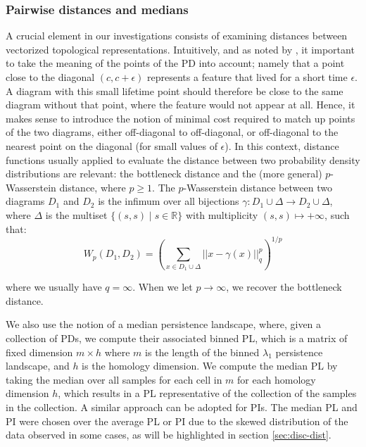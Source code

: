 \documentclass{article}
\begin{document}
\subsubsection{Pairwise distances and medians}\label{sec:pairwise_distance_definitions}

A crucial element in our investigations consists of examining distances between vectorized
topological representations. Intuitively, and as noted by \citet{berwald2018computing}, it important
to take the meaning of the points of the PD into account; namely that a point close to the diagonal
$(c,c+\epsilon)$ represents a feature that lived for a short time $\epsilon$. A diagram with this
small lifetime point should therefore be close to the same diagram without that point, where the
feature would not appear at all. Hence, it makes sense to introduce the notion of minimal cost
required to match up points of the two diagrams, either off-diagonal to off-diagonal, or
off-diagonal to the nearest point on the diagonal (for small values of $\epsilon$). In this context,
distance functions usually applied to evaluate the distance between two probability density
distributions are relevant: the bottleneck distance and the (more general) $p$-Wasserstein distance,
where $p\geq 1$. The $p$-Wasserstein distance between two diagrams $D_1$ and $D_2$ is the infimum
over all bijections $\gamma: D_1 \cup \Delta \to D_2 \cup \Delta$, where $\Delta$ is the multiset
$\lbrace (s, s) \mid s \in \mathbb{R} \rbrace$ with multiplicity $(s,s) \mapsto +\infty$, such that:
\begin{equation}
  \label{eq:wasserstein_distance}
  W_p(D_1,D_2)=\left(\sum_{x \in D_1 \cup \Delta} ||x - \gamma(x)||_q^p \right)^{1/p}
\end{equation}

where we usually have $q=\infty$. When we let $p\to\infty$, we recover the bottleneck distance.

We also use the notion of a median persistence landscape, where, given a collection of PDs, we
compute their associated binned PL, which is a matrix of fixed dimension $m\times h$ where $m$ is
the length of the binned $\lambda_1$ persistence landscape, and $h$ is the homology dimension. We
compute the median PL by taking the median over all samples for each cell in $m$ for each homology
dimension $h$, which results in a PL representative of the collection of the samples in the
collection. A similar approach can be adopted for PIs. The median PL and PI were chosen over the
average PL or PI due to the skewed distribution of the data observed in some cases, as will be
highlighted in section \ref{sec:disc-dist}.
\end{document}
